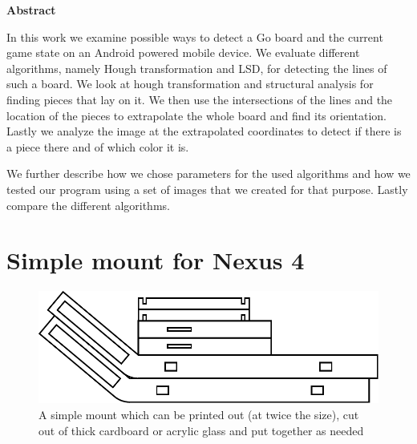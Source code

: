 \documentclass[english,bt]{package/lmedoc}
\begin{document}
\begin{center}
\bfseries
Abstract
\normalfont

In this work we examine possible ways to detect a Go board and the current game state on an Android powered mobile device. We evaluate different algorithms, namely Hough transformation and LSD, for detecting the lines of such a board.  We look at hough transformation and structural analysis for finding pieces that lay on it. We then use the intersections of the lines and the location of the pieces to extrapolate the whole board and find its orientation. Lastly we analyze the image at the extrapolated coordinates to detect if there is a piece there and of which color it is.

We further describe how we chose parameters for the used algorithms and how we tested our program using a set of images that we created for that purpose. Lastly compare the different algorithms.
\end{center}

\cleardoublepage

\tableofcontents

\cleardoublepage {}


\cleardoublepage

\cleardoublepage

\cleardoublepage

\cleardoublepage

\cleardoublepage

\appendix
\cleardoublepage
\chapter{Simple mount for Nexus 4}
\label{appendix-mount}
\begin{figure}
    \center
    \includegraphics{images/halter.pdf}
    \caption{A simple mount which can be printed out (at twice the size), cut out of thick cardboard or acrylic glass and put together as needed}
\end{figure}

\cleardoublepage
\cleardoublepage
\end{document}
